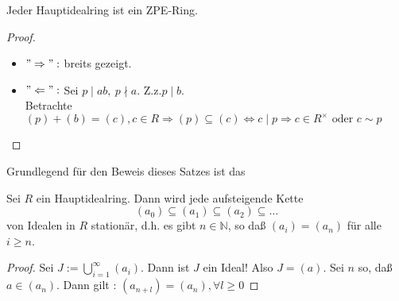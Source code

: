 \begin{theorem}
    Jeder Hauptidealring ist ein ZPE-Ring.
\end{theorem}
\begin{proof}
    \begin{itemize}
        \item \("\Rightarrow":\) breits gezeigt.
        \item \("\Leftarrow":\) Sei \(p\mid ab,\ p\nmid a\). Z.z.\(p\mid b\).\\
        Betrachte \((p)+(b)=(c),c\in R\Rightarrow(p)\subseteq (c)\Leftrightarrow c\mid p\Rightarrow c\in R^\times \text{ oder } c\sim p\)
    \end{itemize}
\end{proof}


Grundlegend für den Beweis dieses Satzes ist das

\begin{lemma}
    Sei $R$ ein Hauptidealring. Dann wird jede aufsteigende Kette
    $$
    \left(a_{0}\right) \subseteq\left(a_{1}\right) \subseteq\left(a_{2}\right) \subseteq \ldots
    $$
    von Idealen in $R$ stationär, d.h. es gibt $n \in \mathbb{N}$, so daß $\left(a_{i}\right)=\left(a_{n}\right)$ für alle $i \geq n$.
\end{lemma}
\begin{proof}
    Sei \(J:=\bigcup_{i=1}^\infty (a_i)\). Dann ist \(J\) ein Ideal! Also \(J=(a).\) Sei \(n\) so, da\ss  \(a\in(a_n)\). Dann gilt : \((a_{n+l})=(a_n),\forall l \geq 0\)
\end{proof}
